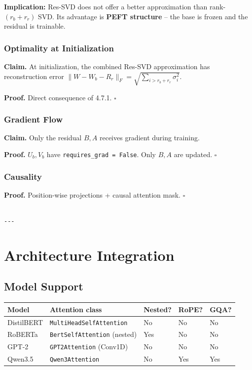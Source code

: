 \textbf{Implication:} Res-SVD does not offer a better approximation than 
rank-$(r_b + r_r)$ SVD. Its advantage is \textbf{PEFT structure} -- the base 
is frozen and the residual is trainable.

\subsubsection{Optimality at Initialization}

\textbf{Claim.} At initialization, the combined Res-SVD approximation has 
reconstruction error $\|W - W_b - R_r\|_F = \sqrt{\sum_{i > r_b+r_r} \sigma_i^2}$.

\textbf{Proof.} Direct consequence of 4.7.1. $\square$

\subsubsection{Gradient Flow}

\textbf{Claim.} Only the residual $B, A$ receives gradient during training.

\textbf{Proof.} $U_b, V_b$ have \texttt{requires\_grad = False}. Only $B, A$ are updated. $\square$

\subsubsection{Causality}

\textbf{Proof.} Position-wise projections + causal attention mask. $\square$
\begin{lstlisting}

---
\end{lstlisting}

\section{Architecture Integration}

\subsection{Model Support}

\begin{table}[H]
\centering
\small
\begin{tabular}{lllll}
\toprule
\textbf{Model} & \textbf{Attention class} & \textbf{Nested?} & \textbf{RoPE?} & \textbf{GQA?} \\
\midrule
DistilBERT & \texttt{MultiHeadSelfAttention} & No & No & No \\
RoBERTa & \texttt{BertSelfAttention} (nested) & Yes & No & No \\
GPT-2 & \texttt{GPT2Attention} (Conv1D) & No & No & No \\
Qwen3.5 & \texttt{Qwen3Attention} & No & Yes & Yes \\
\bottomrule
\end{tabular}
\end{table}

